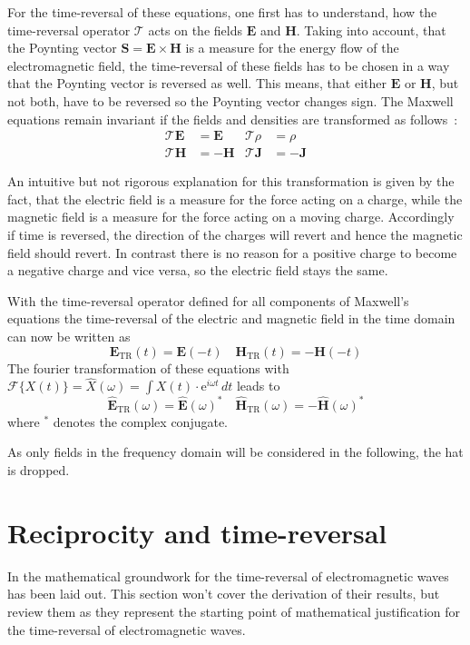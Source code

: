 For the time-reversal of these equations, one first has to understand, how the time-reversal operator \(\mathcal{T}\) acts on the fields \(\bm{E}\) and \(\bm{H}\).
Taking into account, that the Poynting vector \(\bm{S} = \bm{E} \times \bm{H}\) is a measure for the energy flow of the electromagnetic field, the time-reversal of these fields has to be chosen in a way that the Poynting vector is reversed as well.
This means, that either \(\bm{E}\) or \(\bm{H}\), but not both, have to be reversed so the Poynting vector changes sign. 
The Maxwell equations remain invariant if the fields and densities are transformed as follows~\parencite{sigwarth_time_2022}:
\begin{align}
    \mathcal{T}\bm{E} &= \bm{E} & \mathcal{T}\rho &= \rho \\
    \mathcal{T}\bm{H} &= -\bm{H} & \mathcal{T}{\bm{J}} &= -{\bm{J}}
\end{align}

An intuitive but not rigorous explanation for this transformation is given by the fact, that the electric field is a measure for the force acting on a charge, while the magnetic field is a measure for the force acting on a moving charge. 
Accordingly if time is reversed, the direction of the charges will revert and hence the magnetic field should revert. 
In contrast there is no reason for a positive charge to become a negative charge and vice versa, so the electric field stays the same.


With the time-reversal operator defined for all components of Maxwell's equations the time-reversal of the electric and magnetic field in the time domain can now be written as
\begin{equation}
    \bm{E}_{\text{TR}}(t) = \bm{E}(-t) \quad \bm{H}_{\text{TR}}(t) = -\bm{H}(-t)
\end{equation}
The fourier transformation of these equations with \(\mathcal{F}\{X(t)\} = \hat{X}(\omega) = \int X(t) \cdot \mathrm{e}^{i\omega t} \, dt\) leads to
\begin{equation}
    \hat{\bm{E}}_{\text{TR}}(\omega) = \hat{\bm{E}}{(\omega)}^* \quad \hat{\bm{H}}_{\text{TR}}(\omega) = -\hat{\bm{H}}{(\omega)}^*
\end{equation}
where \(^*\) denotes the complex conjugate. 

As only fields in the frequency domain will be considered in the following, the hat is dropped.



\section{Reciprocity and time-reversal}\label{sec:math_foundations_em_tr}
In \parencite{de_rosny_theory_2010} the mathematical groundwork for the time-reversal of electromagnetic waves has been laid out.
This section won't cover the derivation of their results, but review them as they represent the starting point of mathematical justification for the time-reversal of electromagnetic waves.

